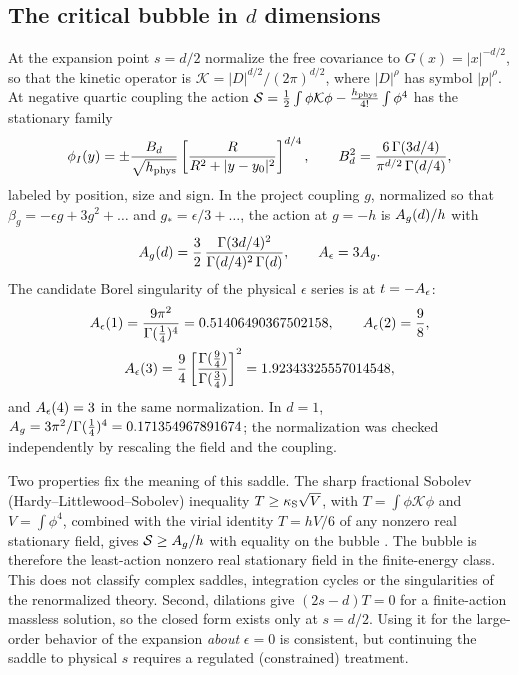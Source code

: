 \subsection{\texorpdfstring{The critical bubble in $d$ dimensions}{The critical bubble in d dimensions}}
At the expansion point $s=d/2$ normalize the free covariance to $G(x)=|x|^{-d/2}$, so
that the kinetic operator is $\mathcal K=|D|^{d/2}/(2\pi)^{d/2}$, where $|D|^\rho$ has symbol
$|p|^\rho$. At negative quartic coupling the action
$\mathcal S=\frac12\int\phi\mathcal K\phi-\frac{h_{\rm phys}}{4!}\int\phi^4$ has the stationary
family
\begin{equation}
 \phi_I(y)=\pm\frac{B_d}{\sqrt{h_{\rm phys}}}
 \left[\frac{R}{R^2+|y-y_0|^2}\right]^{d/4},\qquad
 B_d^2=\frac{6\,\Gamma(3d/4)}{\pi^{d/2}\,\Gamma(d/4)},
 \label{rs:eq:bubble}
\end{equation}
labeled by position, size and sign. In the project coupling $g$, normalized so that
$\beta_g=-\epsilon g+3g^2+\dots$ and $g_*=\epsilon/3+\dots$, the action at $g=-h$ is
$A_g(d)/h$ with
\begin{equation}
 A_g(d)=\frac32\,\frac{\Gamma(3d/4)^2}{\Gamma(d/4)^2\,\Gamma(d)},\qquad
 A_\epsilon=3A_g .
 \label{rs:eq:action}
\end{equation}
The candidate Borel singularity of the physical $\epsilon$ series is at $t=-A_\epsilon$:
\begin{equation}
 \begin{gathered}
 A_\epsilon(1)=\frac{9\pi^2}{\Gamma(\frac14)^4}=0.51406490367502158,\qquad
 A_\epsilon(2)=\frac98,\\
 A_\epsilon(3)=\frac94\left[\frac{\Gamma(\frac94)}{\Gamma(\frac34)}\right]^2=1.92343325557014548,
 \end{gathered}
 \label{rs:eq:actions}
\end{equation}
and $A_\epsilon(4)=3$ in the same normalization. In $d=1$, $A_g=3\pi^2/\Gamma(\frac14)^4
=0.171354967891674$; the normalization was checked independently by rescaling the field
and the coupling.

Two properties fix the meaning of this saddle. The sharp fractional Sobolev
(Hardy--Littlewood--Sobolev) inequality $T\ge\kappa_{\rm S}\sqrt V$, with $T=\int\phi\mathcal K\phi$ and
$V=\int\phi^4$, combined with the virial identity $T=hV/6$ of any nonzero real stationary
field, gives $\mathcal S\ge A_g/h$ with equality on the bubble \cite{rs:FrankLieb,rs:ChenLiOu}. The
bubble is therefore the least-action nonzero real stationary field in the finite-energy
class. This does not classify complex saddles, integration cycles or the singularities of
the renormalized theory. Second, dilations give $(2s-d)T=0$ for a finite-action massless
solution, so the closed form exists only at $s=d/2$. Using it for the large-order
behavior of the expansion \emph{about} $\epsilon=0$ is consistent, but continuing the
saddle to physical $s$ requires a regulated (constrained) treatment.

